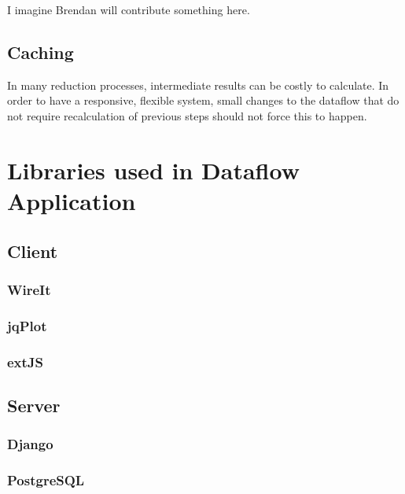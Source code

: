 \documentclass[pdf]{iucr}           %
\begin{document}
I imagine Brendan will contribute something here.



\subsection{Caching}

In many reduction processes, intermediate results can be costly to calculate.  In order to
have a responsive, flexible system, small changes to the dataflow that do not require recalculation
of previous steps should not force this to happen.

\appendix
\section{Libraries used in Dataflow Application}

\subsection{Client}

\subsubsection{WireIt}

\subsubsection{jqPlot}

\subsubsection{extJS}

\subsection{Server}

\subsubsection{Django}

\subsubsection{PostgreSQL}
\end{document}
